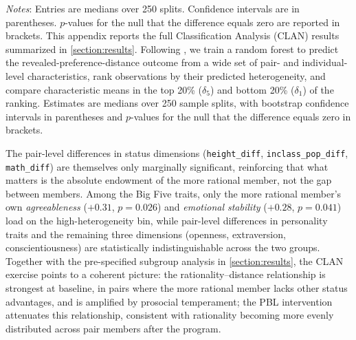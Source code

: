 \documentclass[11 pt]{article}
\begin{document}
\begin{table}[H]
\begin{threeparttable}
\begin{tabular}{lccc}
\end{tabular}
\end{threeparttable}
\begin{minipage}{\textwidth}
{\footnotesize \emph{Notes}: Entries are medians over 250 splits. Confidence intervals are in parentheses. $p$-values for the null that the difference equals zero are reported in brackets. This appendix reports the full Classification Analysis (CLAN) results summarized in \autoref{section:results}. Following \citet{chernozhukov2018generic}, we train a random forest to predict the revealed-preference-distance outcome from a wide set of pair- and individual-level characteristics, rank observations by their predicted heterogeneity, and compare characteristic means in the top 20\% ($\delta_5$) and bottom 20\% ($\delta_1$) of the ranking. Estimates are medians over 250 sample splits, with bootstrap confidence intervals in parentheses and $p$-values for the null that the difference equals zero in brackets.

The pair-level differences in status dimensions (\texttt{height\_diff}, \texttt{inclass\_pop\_diff}, \texttt{math\_diff}) are themselves only marginally significant, reinforcing that what matters is the absolute endowment of the more rational member, not the gap between members. Among the Big Five traits, only the more rational member's own \emph{agreeableness} ($+0.31$, $p = 0.026$) and \emph{emotional stability} ($+0.28$, $p = 0.041$) load on the high-heterogeneity bin, while pair-level differences in personality traits and the remaining three dimensions (openness, extraversion, conscientiousness) are statistically indistinguishable across the two groups. Together with the pre-specified subgroup analysis in \autoref{section:results}, the CLAN exercise points to a coherent picture: the rationality--distance relationship is strongest at baseline, in pairs where the more rational member lacks other status advantages, and is amplified by prosocial temperament; the PBL intervention attenuates this relationship, consistent with rationality becoming more evenly distributed across pair members after the program.}
\end{minipage}
\end{table}
\end{document}
